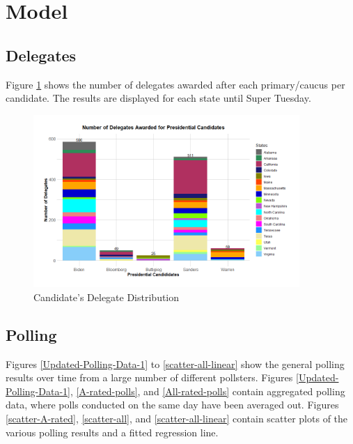 \section{Model}\label{model}

\subsection{Delegates}

Figure \ref{Delegate} shows the number of delegates awarded after each primary/caucus per candidate. The results are displayed for each state until Super Tuesday.

\begin{figure}[H]
    \centering
    \includegraphics[width=0.9\textwidth]{figures/Delegate.png}
    \caption{Candidate's Delegate Distribution}
    \label{Delegate}
\end{figure}

\subsection{Polling}

Figures \ref{Updated-Polling-Data-1} to \ref{scatter-all-linear} show the general polling results over time from a large number of different pollsters. Figures \ref{Updated-Polling-Data-1}, \ref{A-rated-polls}, and \ref{All-rated-polls} contain aggregated polling data, where polls conducted on the same day have been averaged out. Figures \ref{scatter-A-rated}, \ref{scatter-all}, and \ref{scatter-all-linear} contain scatter plots of the various polling results and a fitted regression line.

